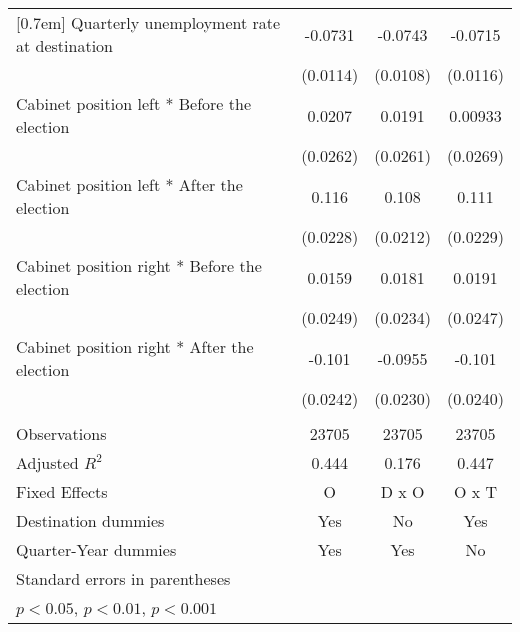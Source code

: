 \begin{table}[htbp]
\begin{tabular}{l*{3}{c}}
[0.7em]
Quarterly unemployment rate at destination&     -0.0731\sym{***}&     -0.0743\sym{***}&     -0.0715\sym{***}\\
                    &    (0.0114)         &    (0.0108)         &    (0.0116)         \\
[0.7em]
Cabinet position left * Before the election&      0.0207         &      0.0191         &     0.00933         \\
                    &    (0.0262)         &    (0.0261)         &    (0.0269)         \\
[0.7em]
Cabinet position left * After the election&       0.116\sym{***}&       0.108\sym{***}&       0.111\sym{***}\\
                    &    (0.0228)         &    (0.0212)         &    (0.0229)         \\
[0.7em]
Cabinet position right * Before the election&      0.0159         &      0.0181         &      0.0191         \\
                    &    (0.0249)         &    (0.0234)         &    (0.0247)         \\
[0.7em]
Cabinet position right * After the election&      -0.101\sym{***}&     -0.0955\sym{***}&      -0.101\sym{***}\\
                    &    (0.0242)         &    (0.0230)         &    (0.0240)         \\
& \\
\hline
Observations        &       23705         &       23705         &       23705         \\
Adjusted \(R^{2}\)  &       0.444         &       0.176         &       0.447         \\
Fixed Effects       &           O         &       D x O         &       O x T         \\
Destination dummies &         Yes         &          No         &         Yes         \\
Quarter-Year dummies&         Yes         &         Yes         &          No         \\
\hline\hline
\multicolumn{4}{l}{\footnotesize Standard errors in parentheses}\\
\multicolumn{4}{l}{\footnotesize \sym{*} \(p<0.05\), \sym{**} \(p<0.01\), \sym{***} \(p<0.001\)}\\
\end{tabular}
\label{tab:main_results}
\end{table}

